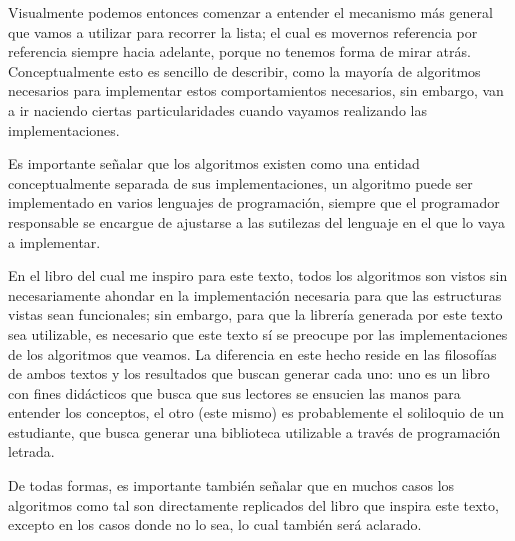 \documentclass[11pt]{article}
\begin{document}
Visualmente podemos entonces comenzar a entender el mecanismo más general que vamos a utilizar para recorrer la lista; el cual es movernos referencia por referencia siempre hacia adelante, porque no tenemos forma de mirar atrás. Conceptualmente esto es sencillo de describir, como la mayoría de algoritmos necesarios para implementar estos comportamientos necesarios, sin embargo, van a ir naciendo ciertas particularidades cuando vayamos realizando las implementaciones.

Es importante señalar que los algoritmos existen como una entidad conceptualmente separada de sus implementaciones, un algoritmo puede ser implementado en varios lenguajes de programación, siempre que el programador responsable se encargue de ajustarse a las sutilezas del lenguaje en el que lo vaya a implementar.

En el libro del cual me inspiro para este texto, todos los algoritmos son vistos sin necesariamente ahondar en la implementación necesaria para que las estructuras vistas sean funcionales; sin embargo, para que la librería generada por este texto sea utilizable, es necesario que este texto sí se preocupe por las implementaciones de los algoritmos que veamos. La diferencia en este hecho reside en las filosofías de ambos textos y los resultados que buscan generar cada uno: uno es un libro con fines didácticos que busca que sus lectores se ensucien las manos para entender los conceptos, el otro (este mismo) es probablemente el soliloquio de un estudiante, que busca generar una biblioteca utilizable a través de programación letrada.

De todas formas, es importante también señalar que en muchos casos los algoritmos como tal son directamente replicados del libro que inspira este texto, excepto en los casos donde no lo sea, lo cual también será aclarado.
\end{document}
